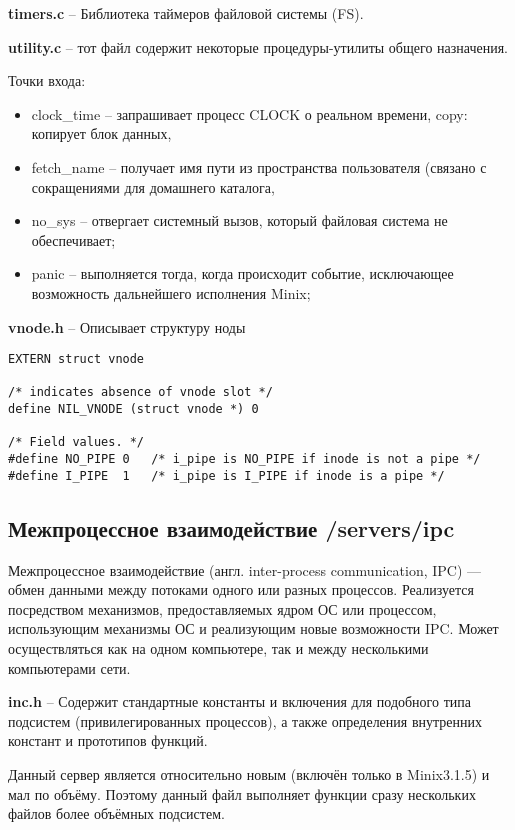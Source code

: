 \textbf{timers.c} -- Библиотека таймеров файловой системы (FS).

\textbf{utility.c} -- тот файл содержит некоторые процедуры-утилиты общего назначения.

Точки входа:
\begin{itemize}
\item clock\_time -- запрашивает процесс CLOCK о реальном времени, copy: копирует блок данных,
\item fetch\_name -- получает имя пути из пространства пользователя (связано с сокращениями для домашнего каталога,
\item no\_sys -- отвергает системный вызов, который файловая система не обеспечивает;
\item panic -- выполняется тогда, когда происходит событие, исключающее возможность дальнейшего исполнения Minix;
\end{itemize}

\textbf{vnode.h} -- Описывает структуру ноды

\begin{Verbatim}[frame=single]
EXTERN struct vnode

/* indicates absence of vnode slot */
define NIL_VNODE (struct vnode *) 0

/* Field values. */
#define NO_PIPE	0	/* i_pipe is NO_PIPE if inode is not a pipe */
#define I_PIPE	1   /* i_pipe is I_PIPE if inode is a pipe */
\end{Verbatim}

\subsection{Межпроцессное взаимодействие /servers/ipc}

Межпроцессное взаимодействие (англ. inter-process communication, IPC) — обмен данными между потоками одного или разных процессов. Реализуется посредством механизмов, предоставляемых ядром ОС или процессом, использующим механизмы ОС и реализующим новые возможности IPC. Может осуществляться как на одном компьютере, так и между несколькими компьютерами сети.

\textbf{inc.h} -- Содержит стандартные константы и включения для подобного типа подсистем (привилегированных процессов), а также определения внутренних констант и прототипов функций.

Данный сервер является относительно новым (включён только в Minix3.1.5) и мал по объёму. Поэтому данный файл выполняет функции сразу нескольких файлов более объёмных подсистем.

